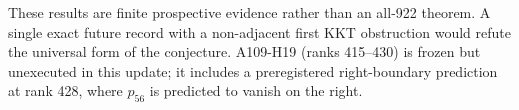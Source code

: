 These results are finite prospective evidence rather than an all-922 theorem. A single exact future record with a non-adjacent first KKT obstruction would refute the universal form of the conjecture. A109-H19 (ranks 415--430) is frozen but unexecuted in this update; it includes a preregistered right-boundary prediction at rank 428, where $p_{56}$ is predicted to vanish on the right.

